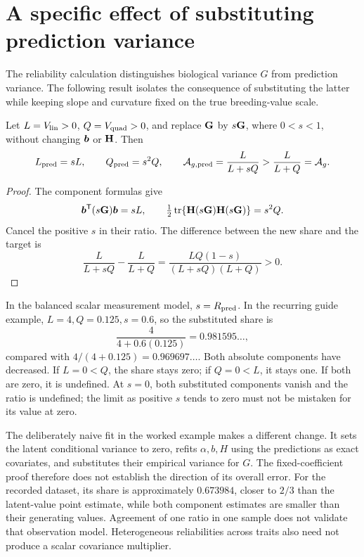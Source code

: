\section{A specific effect of substituting prediction variance}
\label{estimation:shrinkage}

The reliability calculation distinguishes biological variance \(G\) from
prediction variance. The following result isolates the consequence of
substituting the latter while keeping slope and curvature fixed on the true
breeding-value scale.

\begin{proposition}
\label{estimation:shrinkage_formula}
Let \(L=V_{\mathrm{lin}}>0\), \(Q=V_{\mathrm{quad}}>0\), and replace \(\mathbf{G}\) by
\(s\mathbf{G}\), where \(0<s<1\), without changing \(\boldsymbol{b}\) or \(\mathbf{H}\).
Then
\begin{equation}
 L_{\rm pred}=sL,\qquad Q_{\rm pred}=s^2Q,\qquad
 \mathcal A_{g,\mathrm{pred}}=\frac{L}{L+sQ}>\frac{L}{L+Q}=\mathcal A_g.
 \label{estimation:shrinkage_share}
\end{equation}
\end{proposition}

\begin{proof}
The component formulas give
\[
 \boldsymbol{b}^{\mathsf T}(s\mathbf{G})\boldsymbol{b}=sL,\qquad
 \tfrac12\operatorname{tr}\{\mathbf{H}(s\mathbf{G})\mathbf{H}(s\mathbf{G})\}=s^2Q.
\]
Cancel the positive \(s\) in their ratio. The difference between the new
share and the target is
\[
 \frac{L}{L+sQ}-\frac{L}{L+Q}
 =\frac{LQ(1-s)}{(L+sQ)(L+Q)}>0.
\]
\end{proof}

In the balanced scalar measurement model, \(s=R_{\rm pred}\). In the
recurring guide example, \(L=4,Q=0.125,s=0.6\), so the substituted share is
\[
 \frac{4}{4+0.6(0.125)}=0.981595\ldots,
\]
compared with \(4/(4+0.125)=0.969697\ldots\). Both absolute components have
decreased. If \(L=0<Q\), the share stays zero; if \(Q=0<L\), it stays one.
If both are zero, it is undefined. At \(s=0\), both substituted components
vanish and the ratio is undefined; the limit as positive \(s\) tends to zero
must not be mistaken for its value at zero.

The deliberately naive fit in the worked example makes a different change.
It sets the latent conditional variance to zero, refits \(\alpha,b,H\) using
the predictions as exact covariates, and substitutes their empirical
variance for \(G\). The fixed-coefficient proof therefore does not establish
the direction of its overall error. For the recorded dataset, its share
is approximately \(0.673984\), closer to \(2/3\) than the latent-value point
estimate, while both component estimates are smaller than their generating
values. Agreement of one ratio in one sample does not validate that
observation model. Heterogeneous reliabilities across traits also need not
produce a scalar covariance multiplier.

